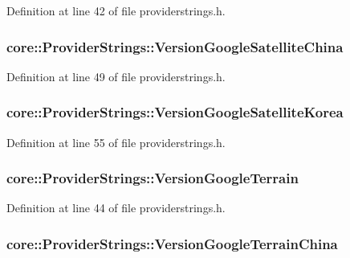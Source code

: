 Definition at line 42 of file providerstrings.\-h.

\hypertarget{group___o_p_map_widget_ga9305b4a54fb603c540a9a8c268a097ec}{
\subsubsection[{Version\-Google\-Satellite\-China}]{ core\-::\-Provider\-Strings\-::\-Version\-Google\-Satellite\-China}}\label{group___o_p_map_widget_ga9305b4a54fb603c540a9a8c268a097ec}


Definition at line 49 of file providerstrings.\-h.

\hypertarget{group___o_p_map_widget_ga33344ab29672c4dcedd40642df473969}{
\subsubsection[{Version\-Google\-Satellite\-Korea}]{ core\-::\-Provider\-Strings\-::\-Version\-Google\-Satellite\-Korea}}\label{group___o_p_map_widget_ga33344ab29672c4dcedd40642df473969}


Definition at line 55 of file providerstrings.\-h.

\hypertarget{group___o_p_map_widget_gacab9db5e4f5aff7ca4ea6bc63e1ca876}{
\subsubsection[{Version\-Google\-Terrain}]{ core\-::\-Provider\-Strings\-::\-Version\-Google\-Terrain}}\label{group___o_p_map_widget_gacab9db5e4f5aff7ca4ea6bc63e1ca876}


Definition at line 44 of file providerstrings.\-h.

\hypertarget{group___o_p_map_widget_gad75c975b2a7aeefd01f65c78e701394b}{
\subsubsection[{Version\-Google\-Terrain\-China}]{ core\-::\-Provider\-Strings\-::\-Version\-Google\-Terrain\-China}}\label{group___o_p_map_widget_gad75c975b2a7aeefd01f65c78e701394b}


